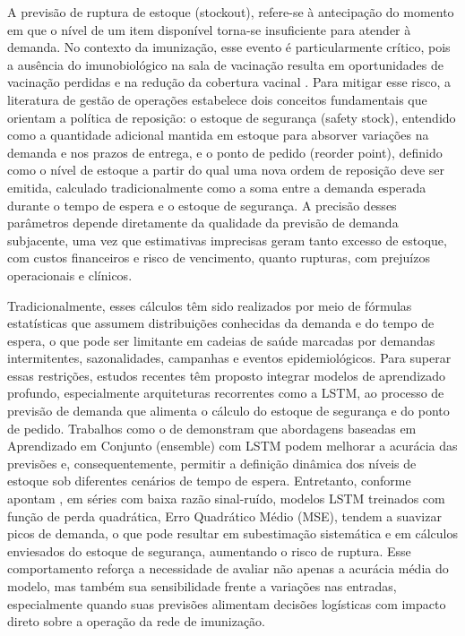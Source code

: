 \documentclass[
    12pt,                %
    openright,           %
    oneside,             %
    a4paper,             %
    english,             %
    brazil               %
]{abntex2}
\begin{document}
A previsão de ruptura de estoque (stockout), refere-se à antecipação do momento em que o nível de um item disponível torna-se insuficiente para atender à demanda. No contexto da imunização, esse evento é particularmente crítico, pois a ausência do imunobiológico na sala de vacinação resulta em oportunidades de vacinação perdidas e na redução da cobertura vacinal \cite{Hariharan2020}. Para mitigar esse risco, a literatura de gestão de operações estabelece dois conceitos fundamentais que orientam a política de reposição: o estoque de segurança (safety stock), entendido como a quantidade adicional mantida em estoque para absorver variações na demanda e nos prazos de entrega, e o ponto de pedido (reorder point), definido como o nível de estoque a partir do qual uma nova ordem de reposição deve ser emitida, calculado tradicionalmente como a soma entre a demanda esperada durante o tempo de espera e o estoque de segurança. A precisão desses parâmetros depende diretamente da qualidade da previsão de demanda subjacente, uma vez que estimativas imprecisas geram tanto excesso de estoque, com custos financeiros e risco de vencimento, quanto rupturas, com prejuízos operacionais e clínicos.

Tradicionalmente, esses cálculos têm sido realizados por meio de fórmulas estatísticas que assumem distribuições conhecidas da demanda e do tempo de espera, o que pode ser limitante em cadeias de saúde marcadas por demandas intermitentes, sazonalidades, campanhas e eventos epidemiológicos. Para superar essas restrições, estudos recentes têm proposto integrar modelos de aprendizado profundo, especialmente arquiteturas recorrentes como a LSTM, ao processo de previsão de demanda que alimenta o cálculo do estoque de segurança e do ponto de pedido. Trabalhos como o de  demonstram que abordagens baseadas em Aprendizado em Conjunto (ensemble) com LSTM podem melhorar a acurácia das previsões e, consequentemente, permitir a definição dinâmica dos níveis de estoque sob diferentes cenários de tempo de espera. Entretanto, conforme apontam , em séries com baixa razão sinal-ruído, modelos LSTM treinados com função de perda quadrática, Erro Quadrático Médio (MSE), tendem a suavizar picos de demanda, o que pode resultar em subestimação sistemática e em cálculos enviesados do estoque de segurança, aumentando o risco de ruptura. Esse comportamento reforça a necessidade de avaliar não apenas a acurácia média do modelo, mas também sua sensibilidade frente a variações nas entradas, especialmente quando suas previsões alimentam decisões logísticas com impacto direto sobre a operação da rede de imunização.
\end{document}
